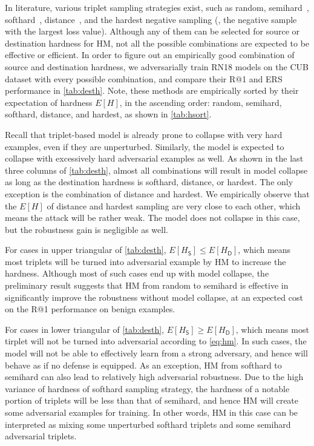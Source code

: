 \documentclass[10pt,twocolumn,letterpaper]{article}
\begin{document}






In literature, various triplet sampling strategies exist, such as random,
semihard~\cite{facenet}, softhard~\cite{revisiting}, distance~\cite{distance},
and the hardest negative sampling (\ie, the negative sample with the largest
loss value).
%
Although any of them can be selected for source or destination hardness for HM,
not all the possible combinations are expected to be effective or efficient.
%
In order to figure out an empirically good combination of source and
destination hardness, we adversarially train RN18 models on the CUB dataset
with every possible combination, and compare their R@1 and ERS performance in
\cref{tab:desth}.
%
Note, these methods are empirically sorted by their expectation of hardness
$E[H]$, in the ascending order: random, semihard, softhard, distance, and
hardest, as shown in \cref{tab:hsort}.


Recall that triplet-based model is already prone to collapse with very hard
examples, even if they are unperturbed.
%
Similarly, the model is expected to collapse with excessively hard adversarial
examples as well.
%
As shown in the last three columns of \cref{tab:desth}, almost all combinations
will result in model collapse as long as the destination hardness is softhard,
distance, or hardest.
%
The only exception is the combination of distance and hardest.
%
We empirically observe that the $E[H]$ of distance and hardest sampling are
very close to each other, which means the attack will be rather weak.
%
The model does not collapse in this case, but the robustness gain is negligible
as well.


For cases in upper triangular of \cref{tab:desth}, $E[H_\mathsf{S}] \leqslant E[H_\mathsf{D}]$,
which means most triplets will be turned into adversarial example by HM
to increase the hardness.
%
Although most of such cases end up with model collapse, the preliminary 
result suggests that HM from random to semihard is effective in significantly
improve the robustness without model collapse, at an expected cost on the R@1
performance on benign examples.

For cases in lower triangular of \cref{tab:desth}, $E[H_\mathsf{S}] \geqslant E[H_\mathsf{D}]$,
which means most tirplet will not be turned into adversarial according to
\cref{eq:hm}.
%
In such cases, the model will not be able to effectively learn from a strong
adversary, and hence will behave as if no defense is equipped.
%
As an exception, HM from softhard to semihard can also lead to relatively high
adversarial robustness.
%
Due to the high variance of hardness of softhard sampling strategy, the
hardness of a notable portion of triplets will be less than that of semihard,
and hence HM will create some adversarial examples for training.
%
In other words, HM in this case can be interpreted as mixing some unperturbed
softhard triplets and some semihard adversarial triplets.
\end{document}
